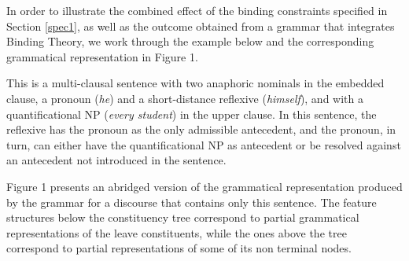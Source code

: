 \documentclass[output=paper
,modfonts
,nonflat]{langsci/langscibook}
\begin{document}
In order to illustrate the combined effect of the binding constraints specified in Section \ref{spec1}, 
as well as the outcome obtained from a grammar that integrates Binding Theory,
we work through the example below and the corresponding grammatical
representation in Figure 1. %
%



\begin{exe}
\end{exe}

This is a
multi-clausal sentence with two anaphoric nominals in the embedded
clause, a pronoun ({\em he}) and a short-distance reflexive ({\em himself}), and with a quantificational
NP ({\em every student}) in the upper clause. In this sentence,
the reflexive has the pronoun as the only admissible antecedent,
and the pronoun, in turn, can either have the quantificational
NP as antecedent or be resolved against an antecedent not 
introduced in the sentence.

Figure 1 presents an abridged version of the grammatical 
representation produced by the grammar for a discourse
that contains only this sentence.
The feature structures below the constituency tree correspond to partial grammatical 
representations of the leave constituents, while the ones above the 
tree correspond to partial representations of some of its non terminal nodes.
\end{document}

